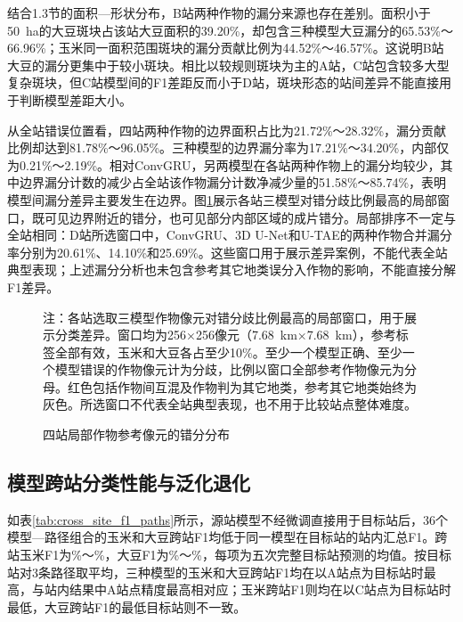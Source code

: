 结合1.3节的面积—形状分布，B站两种作物的漏分来源也存在差别。面积小于50~ha的大豆斑块占该站大豆面积的39.20\%，却包含三种模型大豆漏分的65.53\%～66.96\%；玉米同一面积范围斑块的漏分贡献比例为44.52\%～46.57\%。这说明B站大豆的漏分更集中于较小斑块。相比以较规则斑块为主的A站，C站包含较多大型复杂斑块，但C站模型间的F1差距反而小于D站，斑块形态的站间差异不能直接用于判断模型差距大小。

从全站错误位置看，四站两种作物的边界面积占比为21.72\%～28.32\%，漏分贡献比例却达到81.78\%～96.05\%。三种模型的边界漏分率为17.21\%～34.20\%，内部仅为0.21\%～2.19\%。相对ConvGRU，另两模型在各站两种作物上的漏分均较少，其中边界漏分计数的减少占全站该作物漏分计数净减少量的51.58\%～85.74\%，表明模型间漏分差异主要发生在边界。图\ref{fig:within_site_errors}展示各站三模型对错分歧比例最高的局部窗口，既可见边界附近的错分，也可见部分内部区域的成片错分。局部排序不一定与全站相同：D站所选窗口中，ConvGRU、3D U-Net和U-TAE的两种作物合并漏分率分别为20.61\%、14.10\%和25.69\%。这些窗口用于展示差异案例，不能代表全站典型表现；上述漏分分析也未包含参考其它地类误分入作物的影响，不能直接分解F1差异。

\begin{figure}[!t]
\centering

\caption{四站局部作物参考像元的错分分布}
\label{fig:within_site_errors}
\par\noindent\begin{minipage}{\textwidth}\songti{}
注：各站选取三模型作物像元对错分歧比例最高的局部窗口，用于展示分类差异。窗口均为256×256像元（7.68~km×7.68~km），参考标签全部有效，玉米和大豆各占至少10\%。至少一个模型正确、至少一个模型错误的作物像元计为分歧，比例以窗口全部参考作物像元为分母。红色包括作物间互混及作物判为其它地类，参考其它地类始终为灰色。所选窗口不代表全站典型表现，也不用于比较站点整体难度。
\end{minipage}
\end{figure}

\subsection{模型跨站分类性能与泛化退化}


如表\ref{tab:cross_site_f1_paths}所示，源站模型不经微调直接用于目标站后，36个模型—路径组合的玉米和大豆跨站F1均低于同一模型在目标站的站内汇总F1。跨站玉米F1为\FCrossCornMin{}\%～\FCrossCornMax{}\%，大豆F1为\FCrossSoyMin{}\%～\FCrossSoyMax{}\%，每项为五次完整目标站预测的均值。按目标站对3条路径取平均，三种模型的玉米和大豆跨站F1均在以A站点为目标站时最高，与站内结果中A站点精度最高相对应；玉米跨站F1则均在以C站点为目标站时最低，大豆跨站F1的最低目标站则不一致。

